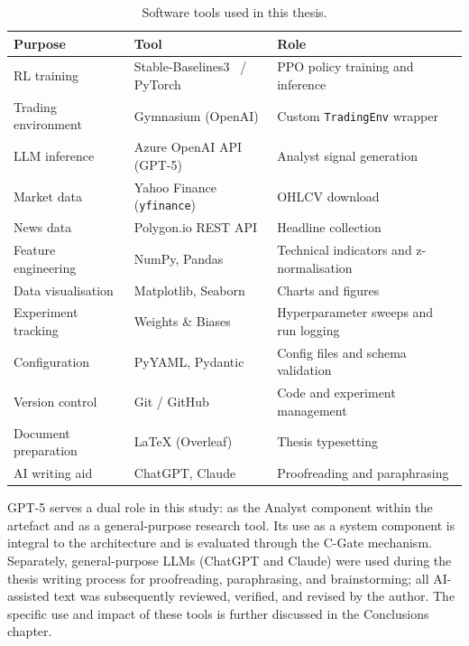 \begin{table}[t]
\centering
\caption{Software tools used in this thesis.}
\label{tab:software-tools}
\begin{tabular}{@{}lll@{}}
\toprule
\textbf{Purpose} & \textbf{Tool} & \textbf{Role} \\
\midrule
RL training       & Stable-Baselines3~\citep{raffin2021stable} / PyTorch
                  & PPO policy training and inference \\
Trading environment & Gymnasium (OpenAI)
                  & Custom \texttt{TradingEnv} wrapper \\
LLM inference     & Azure OpenAI API (GPT-5)
                  & Analyst signal generation \\
Market data       & Yahoo Finance (\texttt{yfinance})
                  & OHLCV download \\
News data         & Polygon.io REST API
                  & Headline collection \\
Feature engineering & NumPy, Pandas
                  & Technical indicators and z-normalisation \\
Data visualisation & Matplotlib, Seaborn
                  & Charts and figures \\
Experiment tracking & Weights \& Biases
                  & Hyperparameter sweeps and run logging \\
Configuration     & PyYAML, Pydantic
                  & Config files and schema validation \\
Version control   & Git / GitHub
                  & Code and experiment management \\
Document preparation & \LaTeX{} (Overleaf)
                  & Thesis typesetting \\
AI writing aid    & ChatGPT, Claude
                  & Proofreading and paraphrasing \\
\bottomrule
\end{tabular}
\end{table}

GPT-5 serves a dual role in this study: as the Analyst component within
the artefact and as a general-purpose research tool. Its use as a system
component is integral to the architecture and is evaluated through the
C-Gate mechanism. Separately, general-purpose LLMs (ChatGPT and Claude)
were used during the thesis writing process for proofreading, paraphrasing,
and brainstorming; all AI-assisted text was subsequently reviewed, verified,
and revised by the author. The specific use and impact of these tools is
further discussed in the Conclusions chapter.

